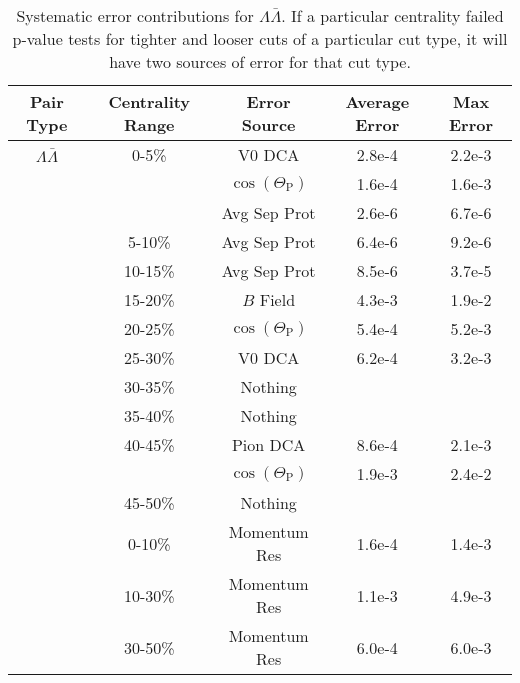 \begin{table}
\caption[Systematic error contributions for $\Lambda\bar{\Lambda}$] {Systematic error contributions for $\Lambda\bar{\Lambda}$.  If a particular centrality failed p-value tests for tighter and looser cuts of a particular cut type, it will have two sources of error for that cut type.} \label{tab:SysErrorSourcesLA} 
\begin{center}
\begin{tabular}{| c | c | c | c | c |}
  \hline                        
  Pair Type & Centrality Range & Error Source & Average Error & Max Error \\
  \hline  
  $\Lambda\bar{\Lambda}$ &  0-5\% & V0 DCA & 2.8e-4 & 2.2e-3 \\
   &         & $\cos(\Theta_{\mathrm{P}})$ & 1.6e-4 & 1.6e-3 \\
   &         & Avg Sep Prot & 2.6e-6 & 6.7e-6 \\
   & 5-10\%  & Avg Sep Prot & 6.4e-6 & 9.2e-6 \\
   & 10-15\% & Avg Sep Prot & 8.5e-6 & 3.7e-5 \\
   & 15-20\% & $B$ Field & 4.3e-3 & 1.9e-2 \\
   & 20-25\% & $\cos(\Theta_{\mathrm{P}})$ & 5.4e-4 & 5.2e-3 \\
   & 25-30\% & V0 DCA & 6.2e-4 & 3.2e-3 \\
   & 30-35\% & Nothing & &  \\
   & 35-40\% & Nothing & &  \\
   & 40-45\% & Pion DCA & 8.6e-4 & 2.1e-3  \\
   &         & $\cos(\Theta_{\mathrm{P}})$ & 1.9e-3 & 2.4e-2 \\
   & 45-50\% & Nothing & &  \\
   & 0-10\%  & Momentum Res & 1.6e-4 & 1.4e-3 \\
   & 10-30\% & Momentum Res & 1.1e-3 & 4.9e-3 \\
   & 30-50\% & Momentum Res & 6.0e-4 & 6.0e-3 \\
  \hline  
\end{tabular}
\end{center}
\end{table}

